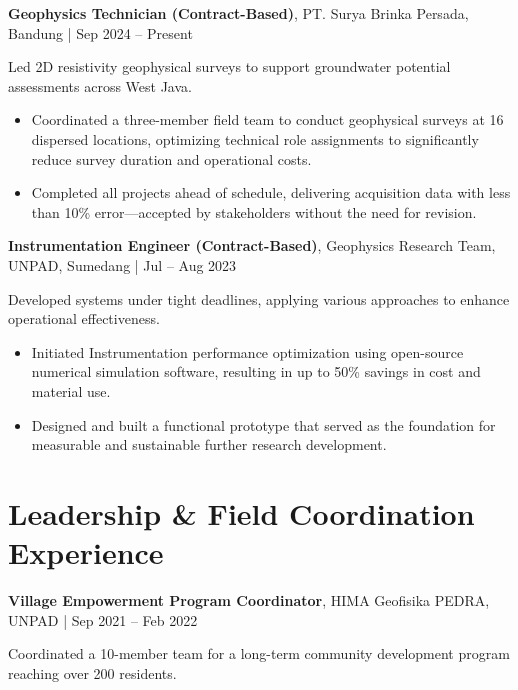 \documentclass[10pt,a4paper]{article}
\begin{document}
\setlength{\fboxsep}{0pt}
\colorbox[HTML]{DCDCDC}{%
  \parbox{\linewidth}{%
    \textbf{Geophysics Technician (Contract-Based)}, PT. Surya Brinka Persada, Bandung \quad | \quad Sep 2024 – Present
  }%
}

Led 2D resistivity geophysical surveys to support groundwater potential assessments across West Java.

\begin{itemize}[left=1.5em, noitemsep, topsep=0pt]
  \item Coordinated a three-member field team to conduct geophysical surveys at 16 dispersed locations, optimizing technical role assignments to significantly reduce survey duration and operational costs.
  \item Completed all projects ahead of schedule, delivering acquisition data with less than 10\% error—accepted by stakeholders without the need for revision.
\end{itemize}


\setlength{\fboxsep}{0pt}
\colorbox[HTML]{DCDCDC}{%
  \parbox{\linewidth}{%
    \textbf{Instrumentation Engineer (Contract-Based)}, Geophysics Research Team, UNPAD, Sumedang \quad | \quad Jul – Aug 2023
  }%
}

Developed systems under tight deadlines, applying various approaches to enhance operational effectiveness.

\begin{itemize}[left=1.5em, noitemsep, topsep=0pt]
  \item Initiated Instrumentation performance optimization using open-source numerical simulation software, resulting in up to 50\% savings in cost and material use.
  \item Designed and built a functional prototype that served as the foundation for measurable and sustainable further research development.
\end{itemize}

\section*{Leadership \& Field Coordination Experience}

\noindent
\setlength{\fboxsep}{0pt}%
\colorbox[HTML]{DCDCDC}{%
  \parbox{\linewidth}{%
    \textbf{Village Empowerment Program Coordinator}, HIMA Geofisika PEDRA, UNPAD \quad | \quad Sep 2021 – Feb 2022%
  }%
}

Coordinated a 10-member team for a long-term community development program reaching over 200 residents.
\end{document}
